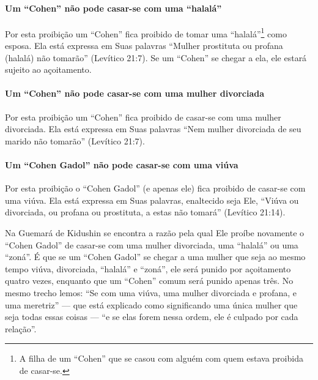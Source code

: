 \paragraph{Um ``Cohen'' não pode casar-se com uma ``halalá''}

Por esta proibição um ``Cohen'' fica proibido de tomar uma
``halalá''\footnote{A filha de um ``Cohen'' que se casou com alguém com quem estava
  proibida de casar-se.} como esposa. Ela está expressa em Suas
palavras ``Mulher prostituta ou profana (halalá) não tomarão'' (Levítico
21:7). Se um ``Cohen'' se chegar a ela, ele estará sujeito ao
açoitamento.

\paragraph{Um ``Cohen'' não pode casar-se com uma mulher divorciada}

Por esta proibição um ``Cohen'' fica proibido de casar-se com uma mulher
divorciada. Ela está expressa em Suas palavras ``Nem mulher divorciada
de seu marido não tomarão'' (Levítico 21:7).


\paragraph{Um ``Cohen Gadol'' não pode casar-se com uma viúva}

Por esta proibição o ``Cohen Gadol'' (e apenas ele) fica proibido de
casar-se com uma viúva. Ela está expressa em Suas palavras, enaltecido
seja Ele, ``Viúva ou divorciada, ou profana ou prostituta, a estas não
tomará'' (Levítico 21:14).

Na Guemará de Kidushin se encontra a razão pela qual Ele proíbe
novamente o ``Cohen Gadol'' de casar-se com uma mulher divorciada, uma
``halalá'' ou uma ``zoná''. É que se um ``Cohen Gadol'' se chegar a uma
mulher que seja ao mesmo tempo viúva, divorciada, ``halalá'' e ``zoná'',
ele será punido por açoitamento quatro vezes, enquanto que um ``Cohen''
comum será punido apenas três. No mesmo trecho lemos: ``Se com uma
viúva, uma mulher divorciada e profana, e uma meretriz'' --- que está
explicado como significando uma única mulher que seja todas essas
coisas --- ``e se elas forem nessa ordem, ele é culpado por cada
relação''.

